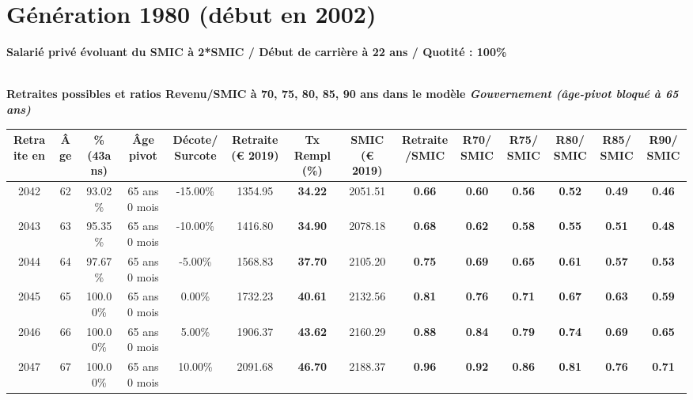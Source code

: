 \newpage 
 
\section{Génération 1980 (début en 2002)\label{Ascendant12_100_22_1980_0}} 
 
{\bf \noindent Salarié privé évoluant du SMIC à 2*SMIC / Début de carrière à 22 ans / Quotité : 100\%}  ~ 

 ~\\{\bf \noindent Retraites possibles et ratios Revenu/SMIC à 70, 75, 80, 85, 90 ans dans le modèle \emph{Gouvernement (âge-pivot bloqué à 65 ans)}}  
 
\begin{adjustbox}{max width=\textwidth} 
\begin{tabular}[htb]{|c|c||c|c|c||c|c||c|c||c|c|c|c|c|} 
\hline 
 Retraite en &  Âge &  \%(43ans) &  Âge pivot &  Décote/Surcote &  Retraite (\euro{} 2019) &  Tx Rempl(\%) &  SMIC (\euro{} 2019) &  Retraite/SMIC &  R70/SMIC &  R75/SMIC &  R80/SMIC &  R85/SMIC &  R90/SMIC \\ 
\hline \hline 
 2042 &  62 &  93.02\% &  65 ans 0 mois &  -15.00\% &  1354.95 &  {\bf 34.22} &  2051.51 &  {\bf {\color{red} 0.66}} &  {\bf {\color{red} 0.60}} &  {\bf {\color{red} 0.56}} &  {\bf {\color{red} 0.52}} &  {\bf {\color{red} 0.49}} &  {\bf {\color{red} 0.46}} \\ 
\hline 
 2043 &  63 &  95.35\% &  65 ans 0 mois &  -10.00\% &  1416.80 &  {\bf 34.90} &  2078.18 &  {\bf {\color{red} 0.68}} &  {\bf {\color{red} 0.62}} &  {\bf {\color{red} 0.58}} &  {\bf {\color{red} 0.55}} &  {\bf {\color{red} 0.51}} &  {\bf {\color{red} 0.48}} \\ 
\hline 
 2044 &  64 &  97.67\% &  65 ans 0 mois &  -5.00\% &  1568.83 &  {\bf 37.70} &  2105.20 &  {\bf {\color{red} 0.75}} &  {\bf {\color{red} 0.69}} &  {\bf {\color{red} 0.65}} &  {\bf {\color{red} 0.61}} &  {\bf {\color{red} 0.57}} &  {\bf {\color{red} 0.53}} \\ 
\hline 
 2045 &  65 &  100.00\% &  65 ans 0 mois &  0.00\% &  1732.23 &  {\bf 40.61} &  2132.56 &  {\bf {\color{red} 0.81}} &  {\bf {\color{red} 0.76}} &  {\bf {\color{red} 0.71}} &  {\bf {\color{red} 0.67}} &  {\bf {\color{red} 0.63}} &  {\bf {\color{red} 0.59}} \\ 
\hline 
 2046 &  66 &  100.00\% &  65 ans 0 mois &  5.00\% &  1906.37 &  {\bf 43.62} &  2160.29 &  {\bf {\color{red} 0.88}} &  {\bf {\color{red} 0.84}} &  {\bf {\color{red} 0.79}} &  {\bf {\color{red} 0.74}} &  {\bf {\color{red} 0.69}} &  {\bf {\color{red} 0.65}} \\ 
\hline 
 2047 &  67 &  100.00\% &  65 ans 0 mois &  10.00\% &  2091.68 &  {\bf 46.70} &  2188.37 &  {\bf {\color{red} 0.96}} &  {\bf {\color{red} 0.92}} &  {\bf {\color{red} 0.86}} &  {\bf {\color{red} 0.81}} &  {\bf {\color{red} 0.76}} &  {\bf {\color{red} 0.71}} \\ 
\hline 
\hline 
\end{tabular} 
\end{adjustbox} 
 
